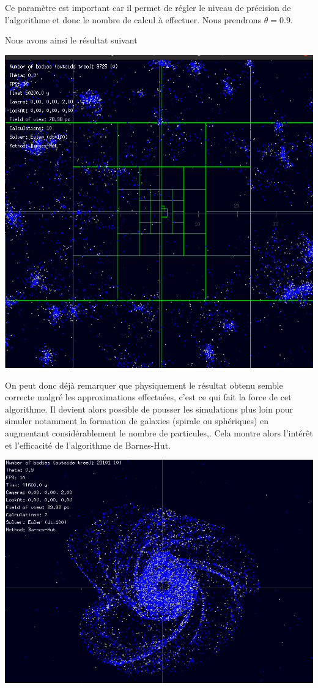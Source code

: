 Ce paramètre est important car il permet de régler le niveau de précision de l'algorithme et donc le nombre de calcul à effectuer.
Nous prendrons $\theta = 0.9$.


Nous avons ainsi le résultat suivant
\begin{center}
\includegraphics[scale=0.4]{./images/arbre_bh.png}
\captionsetup{hypcap=false}
\label{fig5}
\end{center}

On peut donc déjà remarquer que physiquement le résultat obtenu semble correcte malgré les approximations effectuées, c'est ce qui fait la force de cet algorithme.
Il devient alors possible de pousser les simulations plus loin pour simuler notamment la formation de galaxies (spirale ou sphériques) en augmentant considérablement le nombre de particules,. Cela montre alors l'intérêt et l'efficacité de l'algorithme de Barnes-Hut.

\begin{center}
\includegraphics[scale=0.9]{./images/spirale_2.png}
\captionsetup{hypcap=false}
\label{fig5}
\end{center}
